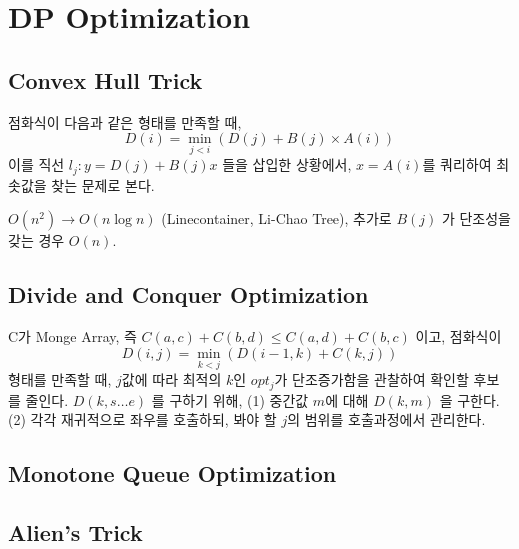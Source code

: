 \chapter{DP Optimization}
\section{Convex Hull Trick}
점화식이 다음과 같은 형태를 만족할 때,
$$D(i) = \min_{j < i} (D(j) + B(j) \times A(i))$$
이를 직선 $l_j : y = D(j) + B(j) x$ 들을 삽입한 상황에서, $x = A(i)$를 쿼리하여 최솟값을 찾는 문제로 본다.

$O(n^2) \to O(n \log n)$ (Linecontainer, Li-Chao Tree), 추가로 $B(j)$ 가 단조성을 갖는 경우 $O(n)$.

\section{Divide and Conquer Optimization}
C가 Monge Array, 즉 $C(a, c) + C(b, d) \leq C(a, d) + C(b, c)$ 이고, 점화식이 
$$D(i, j) = \min_{k < j} (D(i-1, k) + C(k, j))$$
형태를 만족할 때, $j$값에 따라 최적의 $k$인 $opt_j$가 단조증가함을 관찰하여 확인할 후보를 줄인다. $D(k, s\dots e)$ 를 구하기 위해, 
(1) 중간값 $m$에 대해 $D(k, m)$ 을 구한다. (2) 각각 재귀적으로 좌우를 호출하되, 봐야 할 $j$의 범위를 호출과정에서 관리한다.

\section{Monotone Queue Optimization}
\section{Alien's Trick}